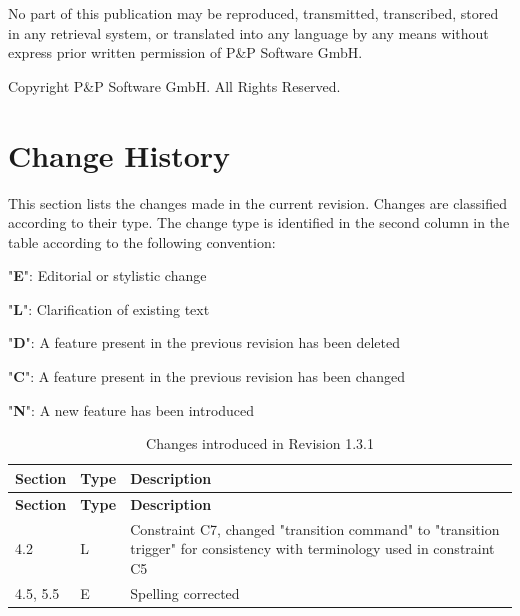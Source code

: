 \documentclass[a4paper,10pt]{article}
\let\stdsection\section
\renewcommand\section{\newpage\stdsection}
\newenvironment{fw_itemize}						%
{\begin{itemize}
  \setlength{\itemsep}{1mm}
  \setlength{\parskip}{0pt}
  \setlength{\parsep}{0pt}}
{\end{itemize}}
\begin{document}
\newpage
\vspace*{\fill}
\begin{center}
No part of this publication may be reproduced, transmitted, transcribed, stored in any retrieval system, or translated into any language
by any means without express prior written permission of P\&P Software GmbH.
\end{center}

\begin{center}
Copyright  P\&P Software GmbH. All Rights Reserved. 
\end{center}
\vspace*{\fill}

\newpage
\tableofcontents
\newpage
\listoffigures
\listoftables
\lstlistoflistings

\setlength{\parskip}{3mm}						%

\newpage

\section{Change History}

This section lists the changes made in the current revision. Changes are classified according to their type. The change type is identified in the second column in the table according to the following convention:

\begin{fw_itemize}
\item "\textbf{E}": Editorial or stylistic change
\item "\textbf{L}": Clarification of existing text
\item "\textbf{D}": A feature present in the previous revision has been deleted
\item "\textbf{C}": A feature present in the previous revision has been changed
\item "\textbf{N}": A new feature has been introduced
\end{fw_itemize}

\begin{longtable}{|p{1.5cm}|p{1cm}|p{8cm}|}
\caption{Changes introduced in Revision 1.3.1}  \\
\hline
\rowcolor{light-gray}
\textbf{Section} & \textbf{Type} & \textbf{Description} \\
\hline\hline
\endfirsthead
\rowcolor{light-gray}
\textbf{Section} & \textbf{Type} & \textbf{Description} \\
\hline\hline
\endhead
4.2 & L & Constraint C7, changed "transition command" to "transition trigger" for consistency with terminology used in constraint C5\\
\hline
4.5, 5.5 & E & Spelling corrected\\
\hline
\end{longtable}
\end{document}
